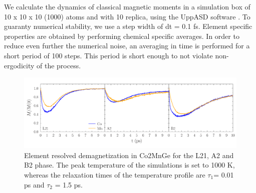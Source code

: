 We calculate the dynamics of classical magnetic moments in a simulation box of 10 x 10 x 10 (1000) atoms and with 10 replica, using the UppASD software \cite{Skubic2008}. To guaranty numerical stability, we use a step width of dt = 0.1 fs. Element specific properties are obtained by performing chemical specific averages. In order to reduce even further the numerical noise, an averaging in time is performed for a short period of 100 steps. This period is short enough to not violate non-ergodicity of the process.

\begin{figure}[htbp]
	\begin{center}
		\includegraphics[width=150mm]{figs/LLGResults}
	\end{center}
	\caption{Element resolved demagnetization in Co2MnGe for the L21, A2 and B2 phase. The peak temperature of the simulations is set to 1000 K, whereas the relaxation times of the temperature profile are $\tau_1$= 0.01 ps and $\tau_2$ = 1.5 ps. }
	\label{fig: LLGResults}
\end{figure}

